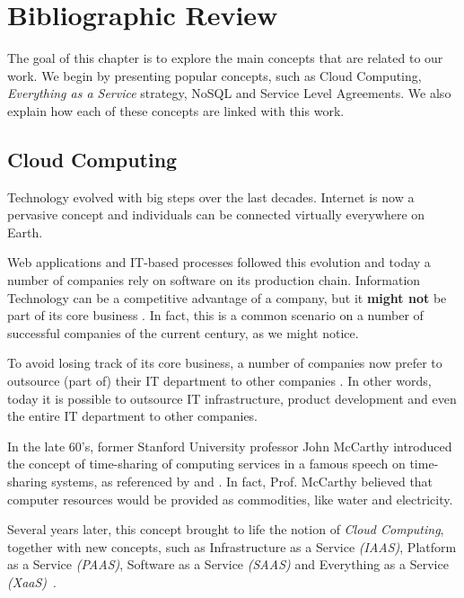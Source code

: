\chapter{Bibliographic Review}\label{bibreviewChap}

The goal of this chapter is to explore the main concepts that are related to our work. We begin by presenting popular concepts, such as Cloud Computing, \textit{Everything as a Service} strategy, NoSQL and Service Level Agreements. 
We also explain how each of these concepts are linked with this work.

\section{Cloud Computing}

Technology evolved with big steps over the last decades. Internet is now a pervasive concept and individuals can be connected virtually everywhere on Earth. \cite{Armbrust09m.:above}

Web applications and IT-based processes followed this evolution and today a number of companies rely on software on its production chain. Information Technology can be a competitive advantage of a company, but it \textbf{might not}  be part of its core business \cite{powell1997information}. In fact, this is a common scenario on a number of successful companies of the current century, as we might notice.

To avoid losing track of its core business, a number of companies now prefer to outsource (part of) their IT department to other companies \cite{quinn2013technology}. In other words, today it is possible to outsource IT infrastructure, product development and even the entire IT department to other companies.

In the late 60's, former Stanford University professor John McCarthy introduced the concept of time-sharing of computing services in a famous speech on time-sharing systems, as referenced by \cite{brendon} and \cite{wiki:mccarthy}. In fact, Prof. McCarthy believed that computer resources would be provided as commodities, like water and electricity.

Several years later, this concept brought to life the notion of \textit{Cloud Computing}, together with new concepts, such as Infrastructure as a Service \textit{(IAAS)}, Platform as a Service \textit{(PAAS)}, Software as a Service \textit{(SAAS)} and Everything as a Service \textit{(XaaS)}~\cite{AViewOfCloudComputing}.

